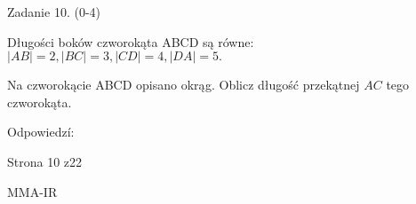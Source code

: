\documentclass[a4paper,12pt]{article}
\begin{document}
Zadanie 10. (0-4)

Długości boków czworokąta ABCD są równe: $|AB|=2, |BC|=3, |CD|=4, |DA|=5.$

Na czworokącie ABCD opisano okrąg. Oblicz długość przekątnej $AC$ tego czworokąta.

Odpowiedzí:

Strona 10 z22

MMA-IR
\end{document}
